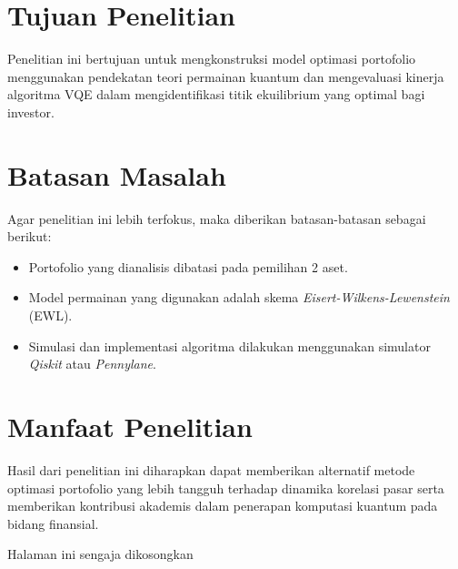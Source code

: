 \section{Tujuan Penelitian}
Penelitian ini bertujuan untuk mengkonstruksi model optimasi portofolio menggunakan pendekatan teori permainan kuantum dan mengevaluasi kinerja algoritma VQE dalam mengidentifikasi titik ekuilibrium yang optimal bagi investor.

\section{Batasan Masalah}
Agar penelitian ini lebih terfokus, maka diberikan batasan-batasan sebagai berikut:
\begin{itemize}
    \item Portofolio yang dianalisis dibatasi pada pemilihan 2 aset.
    \item Model permainan yang digunakan adalah skema \textit{Eisert-Wilkens-Lewenstein} (EWL).
    \item Simulasi dan implementasi algoritma dilakukan menggunakan simulator \textit{Qiskit} atau \textit{Pennylane}.
\end{itemize}

\section{Manfaat Penelitian}
Hasil dari penelitian ini diharapkan dapat memberikan alternatif metode optimasi portofolio yang lebih tangguh terhadap dinamika korelasi pasar serta memberikan kontribusi akademis dalam penerapan komputasi kuantum pada bidang finansial.

\newpage
\thispagestyle{empty}
\vspace*{\fill}
    \begin{center}
	Halaman ini sengaja dikosongkan
    \end{center}
\vspace*{\fill}
\pagebreak
